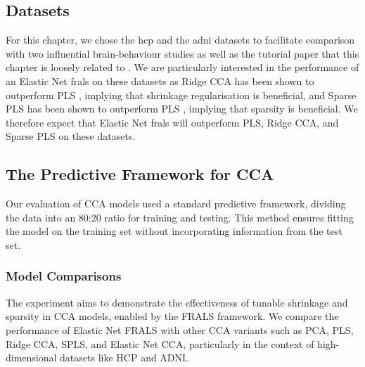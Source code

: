 \subsection{Datasets}\label{subsec:datasets}

For this chapter, we chose the \acrshort{hcp} and the \acrshort{adni} datasets to facilitate comparison with two influential brain-behaviour studies \citep{smith2015positive, monteiro2016multiple} as well as the tutorial paper that this chapter is loosely related to \citep{mihalik2022canonical}.
We are particularly interested in the performance of an Elastic Net \acrshort{frals} on these datasets as Ridge CCA has been shown to outperform PLS \citep{mihalik2022canonical}, implying that shrinkage regularisation is beneficial, and Sparse PLS has been shown to outperform PLS \citep{monteiro2016multiple}, implying that sparsity is beneficial. 
We therefore expect that Elastic Net \acrshort{frals} will outperform PLS, Ridge CCA, and Sparse PLS on these datasets.

\subsection{The Predictive Framework for CCA}\label{subsec:the-predictive-framework-for-cca}

Our evaluation of CCA models used a standard predictive framework, dividing the data into an 80:20 ratio for training and testing. This method ensures fitting the model on the training set without incorporating information from the test set.

\subsubsection{Model Comparisons}

The experiment aims to demonstrate the effectiveness of tunable shrinkage and sparsity in CCA models, enabled by the FRALS framework.
We compare the performance of Elastic Net FRALS with other CCA variants such as PCA, PLS, Ridge CCA, SPLS, and Elastic Net CCA, particularly in the context of high-dimensional datasets like HCP and ADNI\@.

